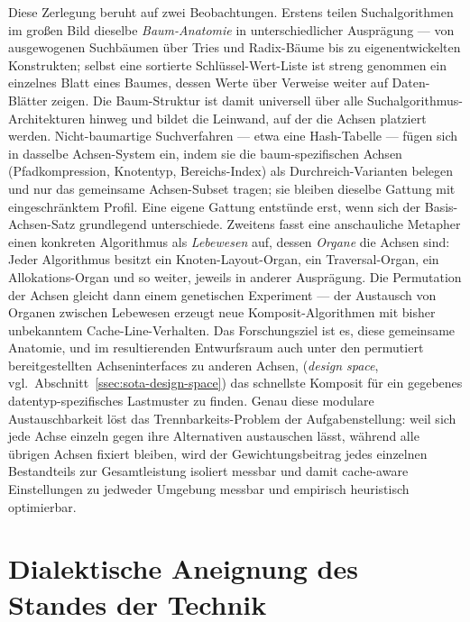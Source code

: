 Diese Zerlegung beruht auf zwei Beobachtungen. Erstens teilen Suchalgorithmen im großen Bild
dieselbe \emph{Baum-Anatomie} in unterschiedlicher Ausprägung --- von ausgewogenen Suchbäumen über
Tries und Radix-Bäume bis zu eigenentwickelten Konstrukten; selbst eine sortierte
Schlüssel-Wert-Liste ist streng genommen ein einzelnes Blatt eines Baumes, dessen Werte über
Verweise weiter auf Daten-Blätter zeigen. Die Baum-Struktur ist damit universell über alle
Suchalgorithmus-Architekturen hinweg und bildet die Leinwand, auf der die Achsen platziert werden.
Nicht-baumartige Suchverfahren --- etwa eine Hash-Tabelle --- fügen sich in dasselbe Achsen-System
ein, indem sie die baum-spezifischen Achsen (Pfadkompression, Knotentyp, Bereichs-Index) als
Durchreich-Varianten belegen und nur das gemeinsame Achsen-Subset tragen; sie bleiben dieselbe
Gattung mit eingeschränktem Profil. Eine eigene Gattung entstünde erst, wenn sich der
Basis-Achsen-Satz grundlegend unterschiede. Zweitens fasst eine anschauliche Metapher einen
konkreten Algorithmus als \emph{Lebewesen} auf, dessen \emph{Organe} die Achsen sind: Jeder
Algorithmus besitzt ein Knoten-Layout-Organ, ein Traversal-Organ, ein Allokations-Organ und so
weiter, jeweils in anderer Ausprägung. Die Permutation der Achsen gleicht dann einem genetischen
Experiment --- der Austausch von Organen zwischen Lebewesen erzeugt neue Komposit-Algorithmen mit
bisher unbekanntem Cache-Line-Verhalten. Das Forschungsziel ist es, diese gemeinsame Anatomie, und im
resultierenden Entwurfsraum auch unter den permutiert bereitgestellten Achseninterfaces zu anderen
Achsen, (\emph{design space}, vgl.\ Abschnitt~\ref{ssec:sota-design-space}) das schnellste Komposit
für ein gegebenes datentyp-spezifisches Lastmuster zu finden. Genau diese modulare Austauschbarkeit
löst das Trennbarkeits-Problem der Aufgabenstellung: weil sich jede Achse einzeln gegen ihre
Alternativen austauschen lässt, während alle übrigen Achsen fixiert bleiben, wird der
Gewichtungsbeitrag jedes einzelnen Bestandteils zur Gesamtleistung isoliert messbar
und damit cache-aware Einstellungen zu jedweder Umgebung messbar und empirisch heuristisch
optimierbar.

\section{Dialektische Aneignung des Standes der Technik}\label{sec:dialectic}

